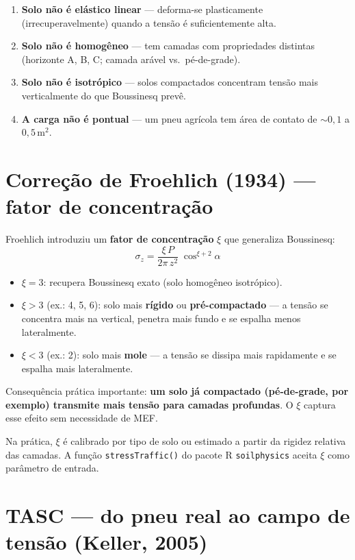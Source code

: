 \documentclass[12pt,a4paper]{article}
\newcommand{\Section}[1]{\needspace{12\baselineskip}\section{#1}}
\begin{document}
\begin{enumerate}
  \item \textbf{Solo não é elástico linear} --- deforma-se plasticamente (irrecuperavelmente) quando a tensão é suficientemente alta.
  \item \textbf{Solo não é homogêneo} --- tem camadas com propriedades distintas (horizonte A, B, C; camada arável vs.\ pé-de-grade).
  \item \textbf{Solo não é isotrópico} --- solos compactados concentram tensão mais verticalmente do que Boussinesq prevê.
  \item \textbf{A carga não é pontual} --- um pneu agrícola tem área de contato de ${\sim}0{,}1$ a $0{,}5$\,m$^2$.
\end{enumerate}

\Section{Correção de Froehlich (1934) --- fator de concentração}

Froehlich introduziu um \textbf{fator de concentração} $\xi$ que generaliza Boussinesq:
\begin{equation}
  \sigma_z = \frac{\xi\, P}{2\pi\, z^2}\;\cos^{\xi+2}\!\alpha
  \label{eq:froehlich}
\end{equation}

\begin{itemize}
  \item $\xi = 3$: recupera Boussinesq exato (solo homogêneo isotrópico).
  \item $\xi > 3$ (ex.: 4, 5, 6): solo mais \textbf{rígido} ou \textbf{pré-compactado} --- a tensão se concentra mais na vertical, penetra mais fundo e se espalha menos lateralmente.
  \item $\xi < 3$ (ex.: 2): solo mais \textbf{mole} --- a tensão se dissipa mais rapidamente e se espalha mais lateralmente.
\end{itemize}

Consequência prática importante: \textbf{um solo já compactado (pé-de-grade, por exemplo) transmite mais tensão para camadas profundas}. O $\xi$ captura esse efeito sem necessidade de MEF.

Na prática, $\xi$ é calibrado por tipo de solo ou estimado a partir da rigidez relativa das camadas. A função \texttt{stressTraffic()} do pacote R \texttt{soilphysics} aceita $\xi$ como parâmetro de entrada.

\Section{TASC --- do pneu real ao campo de tensão (Keller, 2005)}
\end{document}
